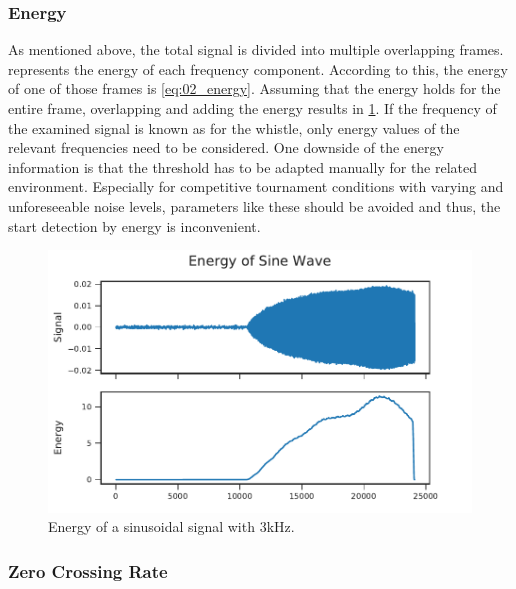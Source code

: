 \subsubsection*{Energy}

As mentioned above, the total signal is divided into multiple overlapping frames.
 represents the energy of each frequency
component.
According to this, the energy of one of those frames is \cref{eq:02_energy}.
Assuming that the energy holds for the entire frame, overlapping and adding the energy
results in \cref{fig:03_energy}.
If the frequency of the examined signal is known as for the whistle, only energy values
of the relevant frequencies need to be considered.
One downside of the energy information is that the threshold has to be adapted
manually for the related environment.
Especially for competitive tournament conditions with varying and unforeseeable noise levels,
parameters like these should be avoided and thus,
the start detection by energy is inconvenient.
\begin{figure}[ht]
	\centering
		\includegraphics[]{figures/sine_energy}
	\caption{Energy of a sinusoidal signal with 3\si{\kilo\hertz}.}
	\label{fig:03_energy}
\end{figure}

\subsubsection*{Zero Crossing Rate}

